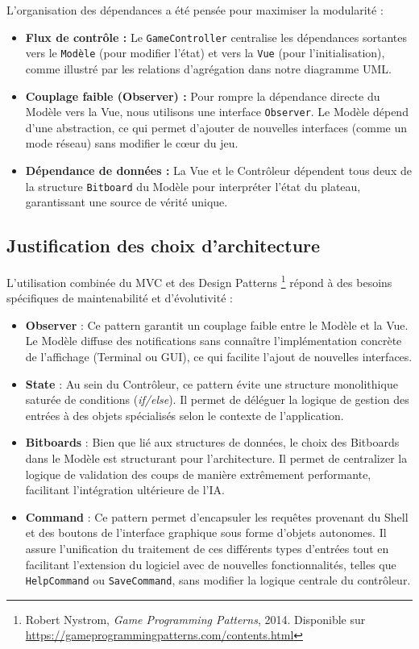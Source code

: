 \documentclass[11pt,a4paper]{article}
\begin{document}
L'organisation des dépendances a été pensée pour maximiser la modularité :
\begin{itemize}
    \item \textbf{Flux de contrôle :} Le \texttt{GameController} centralise les dépendances sortantes vers le \texttt{Modèle} (pour modifier l'état) et vers la \texttt{Vue} (pour l'initialisation), comme illustré par les relations d'agrégation dans notre diagramme UML.
    \item \textbf{Couplage faible (Observer) :} Pour rompre la dépendance directe du Modèle vers la Vue, nous utilisons une interface \texttt{Observer}. Le Modèle dépend d'une abstraction, ce qui permet d'ajouter de nouvelles interfaces (comme un mode réseau) sans modifier le cœur du jeu.
    \item \textbf{Dépendance de données :} La Vue et le Contrôleur dépendent tous deux de la structure \texttt{Bitboard} du Modèle pour interpréter l'état du plateau, garantissant une source de vérité unique.
\end{itemize}

\subsection{Justification des choix d'architecture}

L'utilisation combinée du MVC et des Design Patterns \footnote{Robert Nystrom, \textit{Game Programming Patterns}, 2014. Disponible sur \url{https://gameprogrammingpatterns.com/contents.html}} répond à des besoins spécifiques de maintenabilité et d'évolutivité :
\begin{itemize}
    \item \textbf{Observer} : Ce pattern garantit un couplage faible entre le Modèle et la Vue. Le Modèle diffuse des notifications sans connaître l'implémentation concrète de l'affichage (Terminal ou GUI), ce qui facilite l'ajout de nouvelles interfaces.
    \item \textbf{State} : Au sein du Contrôleur, ce pattern évite une structure monolithique saturée de conditions (\textit{if/else}). Il permet de déléguer la logique de gestion des entrées à des objets spécialisés selon le contexte de l'application.
    \item \textbf{Bitboards} : Bien que lié aux structures de données, le choix des Bitboards dans le Modèle est structurant pour l'architecture. Il permet de centralizer  la logique de validation des coups de manière extrêmement performante, facilitant l'intégration ultérieure de l'IA.
    \item \textbf{Command} : Ce pattern permet d'encapsuler les requêtes provenant du Shell et des boutons de l'interface graphique sous forme d'objets autonomes. Il assure l'unification du traitement de ces différents types d'entrées tout en facilitant l'extension du logiciel avec de nouvelles fonctionnalités, telles que \texttt{HelpCommand} ou \texttt{SaveCommand}, sans modifier la logique centrale du contrôleur.
\end{itemize}
\end{document}

